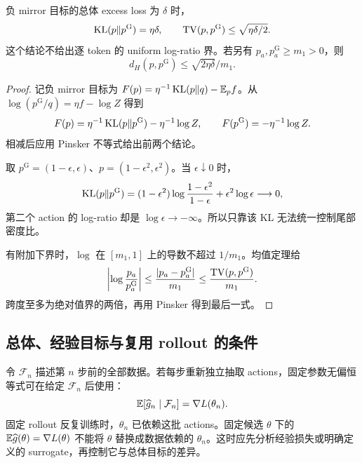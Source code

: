 \begin{proposition}
\label{dyn:mdpo-gap}
负 mirror 目标的总体 excess loss 为 $\delta$ 时，
\begin{equation}
\operatorname{KL}(p\Vert p^{\mathrm G})=\eta\delta,\qquad
\operatorname{TV}(p,p^{\mathrm G})\le\sqrt{\eta\delta/2}.
\end{equation}
这个结论不给出逐 token 的 uniform log-ratio 界。若另有 $p_a,p^{\mathrm G}_a\ge m_1>0$，则
\begin{equation}
d_H(p,p^{\mathrm G})\le\sqrt{2\eta\delta}/m_1.
\end{equation}
\end{proposition}
\begin{proof}
记负 mirror 目标为 $F(p)=\eta^{-1}\operatorname{KL}(p\Vert q)-\mathbb E_pf$。从 $\log(p^{\mathrm G}/q)=\eta f-\log Z$ 得到
\begin{equation*}
F(p)=\eta^{-1}\operatorname{KL}(p\Vert p^{\mathrm G})-\eta^{-1}\log Z,
\qquad F(p^{\mathrm G})=-\eta^{-1}\log Z.
\end{equation*}
相减后应用 Pinsker 不等式给出前两个结论。

取 $p^{\mathrm G}=(1-\epsilon,\epsilon)$、$p=(1-\epsilon^2,\epsilon^2)$。当 $\epsilon\downarrow0$ 时，
\begin{equation*}
\operatorname{KL}(p\Vert p^{\mathrm G})
=(1-\epsilon^2)\log\frac{1-\epsilon^2}{1-\epsilon}
+\epsilon^2\log\epsilon\longrightarrow0,
\end{equation*}
第二个 action 的 log-ratio 却是 $\log\epsilon\to-\infty$。所以只靠该 KL 无法统一控制尾部密度比。

有附加下界时，$\log$ 在 $[m_1,1]$ 上的导数不超过 $1/m_1$。均值定理给
\begin{equation*}
\left|\log\frac{p_a}{p^{\mathrm G}_a}\right|
\le\frac{|p_a-p^{\mathrm G}_a|}{m_1}
\le\frac{\operatorname{TV}(p,p^{\mathrm G})}{m_1}.
\end{equation*}
跨度至多为绝对值界的两倍，再用 Pinsker 得到最后一式。
\end{proof}

\subsection{总体、经验目标与复用 rollout 的条件}
\label{dyn:replay}

令 $\mathcal F_n$ 描述第 $n$ 步前的全部数据。若每步重新独立抽取 actions，固定参数无偏恒等式可在给定 $\mathcal F_n$ 后使用：
\begin{equation}
\mathbb E[\widehat g_n\mid\mathcal F_n]=\nabla L(\theta_n).
\end{equation}
固定 rollout 反复训练时，$\theta_n$ 已依赖这批 actions。固定候选 $\theta$ 下的 $\mathbb E\widehat g(\theta)=\nabla L(\theta)$ 不能将 $\theta$ 替换成数据依赖的 $\theta_n$。这时应先分析经验损失或明确定义的 surrogate，再控制它与总体目标的差异。

